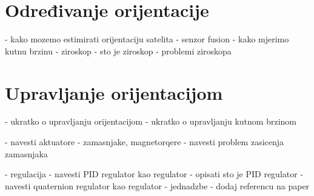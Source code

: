 \documentclass[times, utf8, diplomski, numeric]{templates/template}
\begin{document}
{    \section{Određivanje orijentacije}{
        - kako mozemo estimirati orijentaciju satelita
            - senzor fusion
        - kako mjerimo kutnu brzinu
            - ziroskop
            - sto je ziroskop
            - problemi ziroskopa
    }

    \section{Upravljanje orijentacijom}{
        - ukratko o upravljanju orijentacijom
        - ukratko o upravljanju kutnom brzinom

        - navesti aktuatore
            - zamasnjake, magnetorqere
            - navesti problem zasicenja zamasnjaka

        - regulacija
            - navesti PID regulator kao regulator
            - opisati sto je PID regulator
            - navesti quaternion regulator kao regulator
                - jednadzbe
                - dodaj referencu na paper
    }
}
\end{document}
